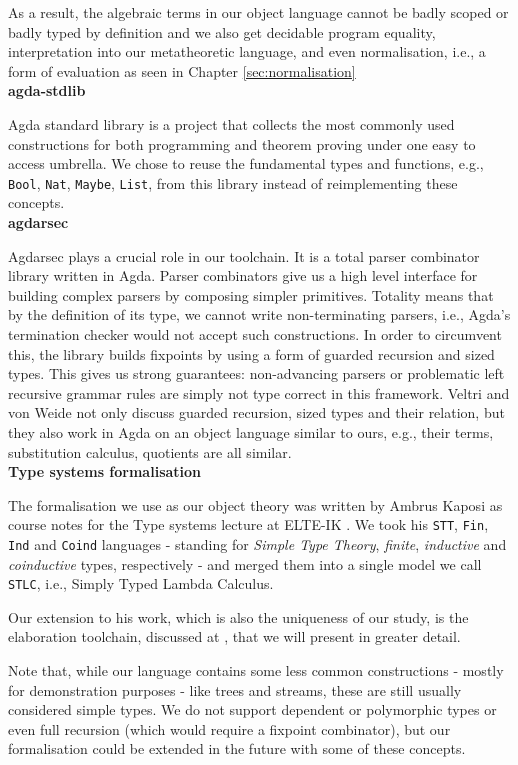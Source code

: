 As a result, the algebraic terms in our object language cannot be badly scoped or badly typed by definition and we also get decidable program equality, interpretation into our metatheoretic language, and even normalisation, i.e., a form of evaluation as seen in Chapter \ref{sec:normalisation}\\

\noindent\textbf{agda-stdlib}

Agda standard library \cite{The_Agda_Community_Agda_Standard_Library_2023} is a project that collects the most commonly used constructions for both programming and theorem proving under one easy to access umbrella. We chose to reuse the fundamental types and functions, e.g., \verb$Bool$, \verb$Nat$, \verb$Maybe$, \verb$List$, from this library instead of reimplementing these concepts.\\

\noindent\textbf{agdarsec}

Agdarsec \cite{allais2018agdarsec} plays a crucial role in our toolchain. It is a total parser combinator library written in Agda. Parser combinators give us a high level interface for building complex parsers by composing simpler primitives. Totality means that by the definition of its type, we cannot write non-terminating parsers, i.e., Agda's termination checker would not accept such constructions. In order to circumvent this, the library builds fixpoints by using a form of guarded recursion and sized types. This gives us strong guarantees: non-advancing parsers or problematic left recursive grammar rules are simply not type correct in this framework. Veltri and von Weide \cite{veltri2019guarded} not only discuss guarded recursion, sized types and their relation, but they also work in Agda on an object language similar to ours, e.g., their terms, substitution calculus, quotients are all similar.\\

\noindent\textbf{Type systems formalisation}

The formalisation we use as our object theory was written by Ambrus Kaposi as course notes for the Type systems lecture at ELTE-IK \cite{typesystems-repo}. We took his \verb$STT$, \verb$Fin$, \verb$Ind$ and \verb$Coind$ languages - standing for \textit{Simple Type Theory}, \textit{finite}, \textit{inductive} and \textit{coinductive} types, respectively - and merged them into a single model we call \verb$STLC$, i.e., Simply Typed Lambda Calculus.

Our extension to his work, which is also the uniqueness of our study, is the elaboration toolchain, discussed at \cite{godelTalk}, that we will present in greater detail.

Note that, while our language contains some less common constructions - mostly for demonstration purposes - like trees and streams, these are still usually considered simple types. We do not support dependent or polymorphic types or even full recursion (which would require a fixpoint combinator), but our formalisation could be extended in the future with some of these concepts.

